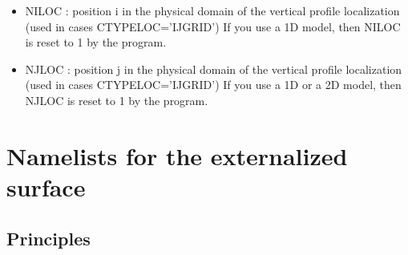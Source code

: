 \begin{itemize}
\item
 NILOC : position i  in the physical domain  of the vertical profile localization   (used in cases 
                                         CTYPELOC='IJGRID') 
If you use a 1D model, then NILOC is reset to 1 by the program.
 
                                         
\item
 NJLOC :  position    j  in the physical domain of the vertical profile localization   (used in cases 
                                         CTYPELOC='IJGRID') 
If you use a 1D or a 2D  model, then NJLOC is reset to 1 by the program.

\end{itemize}              




\section{Namelists for the externalized surface}
\subsection{Principles}

